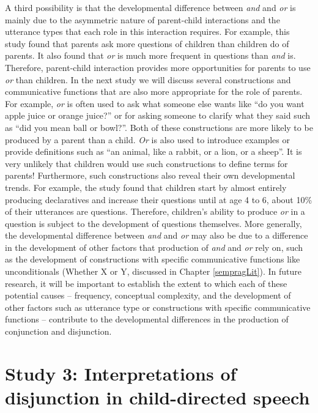 \documentclass[floatsintext,man]{apa6}
\theoremstyle{definition}
\theoremstyle{definition}
\theoremstyle{definition}
\theoremstyle{remark}
\begin{document}
A third possibility is that the developmental difference between
\emph{and} and \emph{or} is mainly due to the asymmetric nature of
parent-child interactions and the utterance types that each role in this
interaction requires. For example, this study found that parents ask
more questions of children than children do of parents. It also found
that \emph{or} is much more frequent in questions than \emph{and} is.
Therefore, parent-child interaction provides more opportunities for
parents to use \emph{or} than children. In the next study we will
discuss several constructions and communicative functions that are also
more appropriate for the role of parents. For example, \emph{or} is
often used to ask what someone else wants like \enquote{do you want
apple juice or orange juice?} or for asking someone to clarify what they
said such as \enquote{did you mean ball or bowl?}. Both of these
constructions are more likely to be produced by a parent than a child.
\emph{Or} is also used to introduce examples or provide definitions such
as \enquote{an animal, like a rabbit, or a lion, or a sheep}. It is very
unlikely that children would use such constructions to define terms for
parents! Furthermore, such constructions also reveal their own
developmental trends. For example, the study found that children start
by almost entirely producing declaratives and increase their questions
until at age 4 to 6, about 10\% of their utterances are questions.
Therefore, children's ability to produce \emph{or} in a question is
subject to the development of questions themselves. More generally, the
developmental difference between \emph{and} and \emph{or} may also be
due to a difference in the development of other factors that production
of \emph{and} and \emph{or} rely on, such as the development of
constructions with specific communicative functions like unconditionals
(Whether X or Y, discussed in Chapter \ref{sempragLit}). In future
research, it will be important to establish the extent to which each of
these potential causes -- frequency, conceptual complexity, and the
development of other factors such as utterance type or constructions
with specific communicative functions -- contribute to the developmental
differences in the production of conjunction and disjunction.

\section{Study 3: Interpretations of disjunction in child-directed
speech}\label{study-3-interpretations-of-disjunction-in-child-directed-speech}
\end{document}
